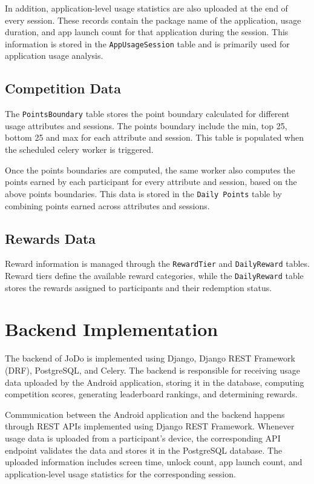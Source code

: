 \documentclass[11pt]{report}
\begin{document}
In addition, application-level usage statistics are also uploaded at the end of every 
session. These records contain the package name of the application, usage duration, and 
app launch count for that application during the session. This information is stored in 
the \texttt{AppUsageSession} table and is primarily used for application usage analysis.

\subsection{Competition Data}
The \texttt{PointsBoundary} table stores the point boundary calculated for different usage attributes and sessions.
The points boundary include the min, top 25, bottom 25 and max for each attribute and session. 
This table is populated when the scheduled celery worker is triggered.

Once the points boundaries are computed, the same worker also computes the points earned by each participant 
for every attribute and session, based on the above points boundaries. This data is stored in the \texttt{Daily Points} 
table by combining points earned across attributes and sessions.

\subsection{Rewards Data}

Reward information is managed through the \texttt{RewardTier} and \texttt{DailyReward} tables. 
Reward tiers define the available reward categories, while the \texttt{DailyReward} table stores the 
rewards assigned to participants and their redemption status.

\section{Backend Implementation}

The backend of JoDo is implemented using Django, Django REST Framework (DRF), PostgreSQL, 
and Celery. The backend is responsible for receiving usage data uploaded by the Android 
application, storing it in the database, computing competition scores, generating 
leaderboard rankings, and determining rewards.

Communication between the Android application and the backend happens through REST APIs 
implemented using Django REST Framework. Whenever usage data is uploaded from a 
participant's device, the corresponding API endpoint validates the data and stores it in 
the PostgreSQL database. The uploaded information includes screen time, unlock count, app 
launch count, and application-level usage statistics for the corresponding session.
\end{document}
